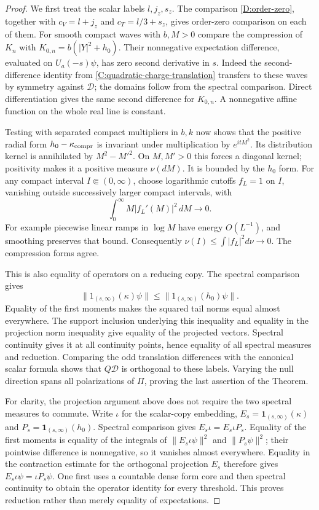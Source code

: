 \begin{proof}
We first treat the scalar labels $l,j_z,s_z$. The comparison
\eqref{D:order-zero}, together with $c_V=l+j_z$ and
$c_T=l/3+s_z$, gives order-zero comparison on each of them.
For smooth compact waves with $b,M>0$ compare the compression
of $K_n$ with $K_{0,n}=b(|Y|^2+h_0)$.
Their nonnegative expectation difference, evaluated on
$U_a(-s)\psi$, has zero second derivative in $s$.
Indeed the second-difference identity from
\eqref{C:quadratic-charge-translation} transfers to these waves
by symmetry against $\mathscr D$; the domains follow from the
spectral comparison. Direct differentiation gives the same
second difference for $K_{0,n}$. A nonnegative affine function
on the whole real line is constant.

Testing with separated compact multipliers in $b,k$ now shows
that the positive radial form
$h_0-\kappa_{\rm compr}$ is invariant under multiplication by
$e^{itM^2}$. Its distribution kernel is annihilated by
$M^2-M'^2$. On $M,M'>0$ this forces a diagonal kernel; positivity
makes it a positive measure $\nu(dM)$. It is bounded by the
$h_0$ form. For any compact interval $I\Subset(0,\infty)$,
choose logarithmic cutoffs $f_L=1$ on $I$, vanishing outside
successively larger compact intervals, with
\[
 \int_0^\infty M|f_L'(M)|^2\,dM\longrightarrow0.
\]
For example piecewise linear ramps in $\log M$ have energy
$O(L^{-1})$, and smoothing preserves that bound. Consequently
$\nu(I)\le\int|f_L|^2d\nu\to0$. The compression forms agree.

This is also equality of operators on a reducing copy. The
spectral comparison gives
\[
 \|1_{(s,\infty)}(\kappa)\psi\|
 \le\|1_{(s,\infty)}(h_0)\psi\|.
\]
Equality of the first moments makes the squared tail norms
equal almost everywhere. The support inclusion underlying this
inequality and equality in the projection norm inequality give
equality of the projected vectors. Spectral continuity gives
it at all continuity points, hence equality of all spectral
measures and reduction. Comparing the odd translation
differences with the canonical scalar formula shows that
$Q\mathscr D$ is orthogonal to these labels. Varying the null
direction spans all polarizations of $\Pi$, proving the last
assertion of the Theorem.

For clarity, the projection argument above does not require the two
spectral measures to commute.  Write $\iota$ for the scalar-copy
embedding, $E_s=\mathbf1_{(s,\infty)}(\kappa)$ and
$P_s=\mathbf1_{(s,\infty)}(h_0)$.  Spectral comparison gives
$E_s\iota=E_s\iota P_s$.  Equality of the first moments is equality
of the integrals of $\|E_s\iota\psi\|^2$ and $\|P_s\psi\|^2$;
their pointwise difference is nonnegative, so it vanishes almost
everywhere.  Equality in the contraction estimate for the orthogonal
projection $E_s$ therefore gives $E_s\iota\psi=\iota P_s\psi$.
One first uses a countable dense form core and then spectral
continuity to obtain the operator identity for every threshold.
This proves reduction rather than merely equality of expectations.


\end{proof}
